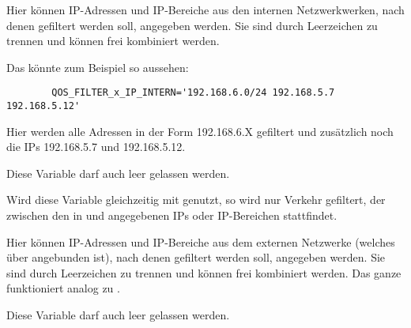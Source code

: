 \begin{description}

   Hier können IP-Adressen und IP-Bereiche aus den internen Netzwerkwerken,
   nach denen gefiltert werden soll, angegeben werden. Sie sind durch Leerzeichen zu
   trennen und können frei kombiniert werden.

   Das könnte zum Beispiel so aussehen:

\begin{example}
\begin{verbatim}
        QOS_FILTER_x_IP_INTERN='192.168.6.0/24 192.168.5.7 192.168.5.12'
\end{verbatim}
\end{example}

   Hier werden alle Adressen in der Form 192.168.6.X gefiltert und
   zusätzlich noch die IPs 192.168.5.7 und 192.168.5.12.

   Diese Variable darf auch leer gelassen werden.

   Wird diese Variable gleichzeitig mit 
   genutzt, so wird nur Verkehr gefiltert, der zwischen den in
    und 
   angegebenen IPs oder IP-Bereichen stattfindet.

   \sloppypar{}



   Hier können IP-Adressen und IP-Bereiche aus dem externen Netzwerke
   (welches über  angebunden ist), nach denen
   gefiltert werden soll, angegeben werden. Sie sind durch Leerzeichen zu
   trennen und können frei kombiniert werden. Das ganze funktioniert
   analog zu .

   Diese Variable darf auch leer gelassen werden.

   \sloppypar{}




\end{description}
